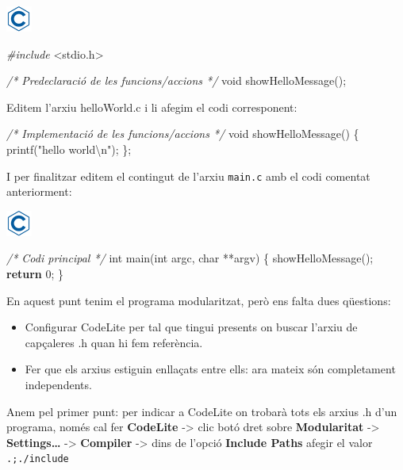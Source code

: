 \documentclass[]{book}
\newenvironment{Shaded}{\begin{snugshade}}{\end{snugshade}}
\newcommand{\CommentTok}[1]{\textcolor[rgb]{0.56,0.35,0.01}{\textit{#1}}}
\newcommand{\ControlFlowTok}[1]{\textcolor[rgb]{0.13,0.29,0.53}{\textbf{#1}}}
\newcommand{\DataTypeTok}[1]{\textcolor[rgb]{0.13,0.29,0.53}{#1}}
\newcommand{\DecValTok}[1]{\textcolor[rgb]{0.00,0.00,0.81}{#1}}
\newcommand{\ImportTok}[1]{#1}
\newcommand{\NormalTok}[1]{#1}
\newcommand{\PreprocessorTok}[1]{\textcolor[rgb]{0.56,0.35,0.01}{\textit{#1}}}
\newcommand{\SpecialCharTok}[1]{\textcolor[rgb]{0.00,0.00,0.00}{#1}}
\newcommand{\StringTok}[1]{\textcolor[rgb]{0.31,0.60,0.02}{#1}}
\providecommand{\tightlist}{%
  \setlength{\itemsep}{0pt}\setlength{\parskip}{0pt}}
\begin{document}
\includegraphics{./img/c.png}

\begin{Shaded}
\begin{Highlighting}[]
\PreprocessorTok{\#include }\ImportTok{\textless{}stdio.h\textgreater{}}

\CommentTok{/* Predeclaració de les funcions/accions */}
\DataTypeTok{void}\NormalTok{ showHelloMessage();}

\NormalTok{Editem l’arxiu helloWorld.c i li afegim el codi corresponent:}

\CommentTok{/* Implementació de les funcions/accions */}
\DataTypeTok{void}\NormalTok{ showHelloMessage() \{}
\NormalTok{    printf(}\StringTok{"hello world}\SpecialCharTok{\textbackslash{}n}\StringTok{"}\NormalTok{);}
\NormalTok{\};}
\end{Highlighting}
\end{Shaded}

I per finalitzar editem el contingut de l'arxiu \texttt{main.c} amb el codi comentat anteriorment:

\includegraphics{./img/c.png}

\begin{Shaded}
\begin{Highlighting}[]
\CommentTok{/* Codi principal */}
\DataTypeTok{int}\NormalTok{ main(}\DataTypeTok{int}\NormalTok{ argc, }\DataTypeTok{char}\NormalTok{ **argv) \{}
\NormalTok{    showHelloMessage();}
    \ControlFlowTok{return} \DecValTok{0}\NormalTok{;}
\NormalTok{\}}
\end{Highlighting}
\end{Shaded}

En aquest punt tenim el programa modularitzat, però ens falta dues qüestions:

\begin{itemize}
\tightlist
\item
  Configurar CodeLite per tal que tingui presents on buscar l'arxiu de capçaleres .h quan hi fem referència.
\item
  Fer que els arxius estiguin enllaçats entre ells: ara mateix són completament independents.
\end{itemize}

Anem pel primer punt: per indicar a CodeLite on trobarà tots els arxius .h d'un programa, només cal fer \textbf{CodeLite} -\textgreater{} clic botó dret sobre \textbf{Modularitat} -\textgreater{} \textbf{Settings\ldots{}} -\textgreater{} \textbf{Compiler} -\textgreater{} dins de l'opció \textbf{Include Paths} afegir el valor \texttt{.;./include}
\end{document}
